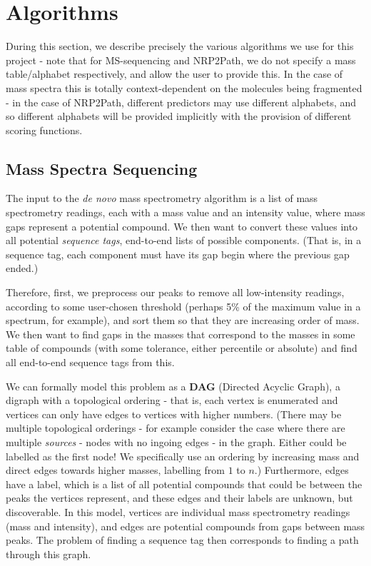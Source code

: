 \documentclass{l4proj}
\newcommand{\cit}[1]{\citep{#1}}
\begin{document}
\section{Algorithms} \label{algorithms}

During this section, we describe precisely the various algorithms we use for this project - note that for MS-sequencing and NRP2Path, we do not specify a mass table/alphabet respectively, and allow the user to provide this. In the case of mass spectra this is totally context-dependent on the molecules being fragmented - in the case of NRP2Path, different predictors may use different alphabets, and so different alphabets will be provided implicitly with the provision of different scoring functions.

\subsection{Mass Spectra Sequencing} \label{msalgorithm}

The input to the \textit{de novo} mass spectrometry algorithm is a list of mass spectrometry readings, each with a mass value and an intensity value, where mass gaps represent a potential compound. We then want to convert these values into all potential \textit{sequence tags}, end-to-end lists of possible components. (That is, in a sequence tag, each component must have its gap begin where the previous gap ended.) 

Therefore, first, we preprocess our peaks to remove all low-intensity readings, according to some user-chosen threshold (perhaps 5\% of the maximum value in a spectrum, for example), and sort them so that they are increasing order of mass. We then want to find gaps in the masses that correspond to the masses in some table of compounds (with some tolerance, either percentile or absolute) and find all end-to-end sequence tags from this.

We can formally model this problem as a \textbf{DAG} (Directed Acyclic Graph), a digraph with a topological ordering - that is, each vertex is enumerated and vertices can only have edges to vertices with higher numbers.  (There may be multiple topological orderings - for example consider the case where there are multiple \textit{sources} - nodes with no ingoing edges - in the graph. Either could be labelled as the first node! We specifically use an ordering by increasing mass and direct edges towards higher masses, labelling from \(1\) to \(n\).) Furthermore, edges have a label, which is a list of all potential compounds that could be between the peaks the vertices represent, and these edges and their labels are unknown, but discoverable. In this model, vertices are individual mass spectrometry readings (mass and intensity), and edges are potential compounds from gaps between mass peaks. The problem of finding a sequence tag then corresponds to finding a path through this graph. \cit{msbook}
\end{document}
